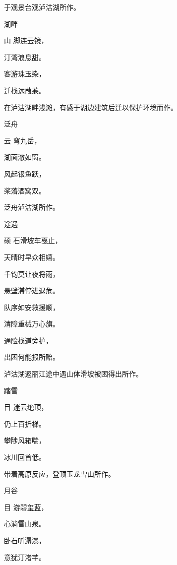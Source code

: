 \documentclass{article}
\newenvironment{poem}[3]{
\begin{minipage}{\textwidth}
\begin{pinyinscope}\begin{center}\Large\linespread{1.4}\selectfont #2\end{center}\end{pinyinscope}
\begin{pinyinscope}
	\begin{center}
	\Large\linespread{1.4}\rmfamily\selectfont #3
}{\end{center}
\end{pinyinscope}
\end{minipage}
}
\begin{document}
于观景台观泸沽湖所作。

\bigbreak

\begin{poem}{}{湖畔}
山脚连云镜，

汀湾浪息甜。

客游珠玉染，

迁栈远葭蒹。
\end{poem}

在泸沽湖畔浅滩，有感于湖边建筑后迁以保护环境而作。

\bigbreak

\begin{poem}{}{泛舟}
云穹{}九岳，

湖面澈如窗。

风起银鱼跃，

桨落酒窝双。
\end{poem}

泛舟泸沽湖所作。

\bigbreak


\begin{poem}{}{途遇}
硕石滑坡车戛止，

天晴时早众相嬉。

千钧莫让夜将雨，

悬壁滞停进退危。

队序如安救援顺，

清障重械万心旗。

{}通险栈道旁护，

出困何能报所贻。
\end{poem}

泸沽湖返丽江途中遇山体滑坡被困得出所作。


\bigbreak


\begin{poem}{}{踏雪}
目迷云绝顶，

仍上百折梯。

攀陟风箱喘，

冰川回首低。
\end{poem}

带着高原反应，登顶玉龙雪山所作。

\bigbreak


\begin{poem}{}{月谷}
目游碧玺蓝，

心淌雪山泉。

卧石听潺瀑，

意犹汀渚芊。
\end{poem}
\end{document}
